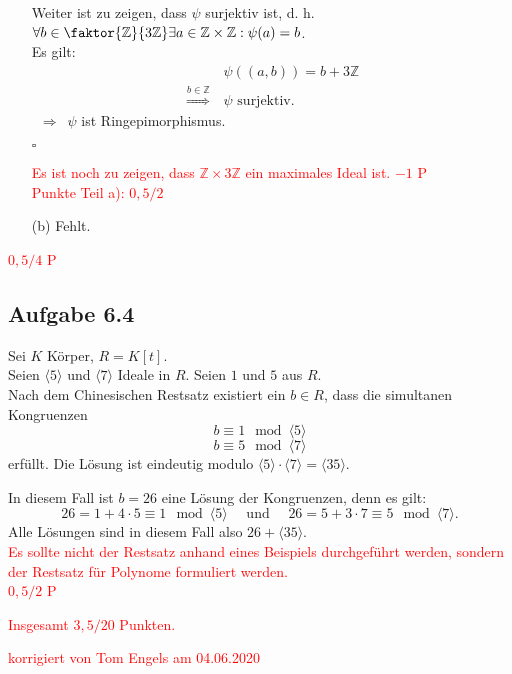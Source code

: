 \documentclass[12pt]{article}
\newcommand{\corr}[1]{\textcolor{red}{#1}}
\newcommand{\QED}{\begin{flushright} $\square$ \end{flushright}}
\newcommand{\df}{\enspace\Longrightarrow\enspace}
\newcommand{\ideal}[1]{\langle#1\rangle}
\begin{document}
\begin{enumerate}
	Weiter ist zu zeigen, dass $\psi$ surjektiv ist, d. h. $\forall b\in \faktor{\mathbb{Z}}{3\mathbb{Z}} \exists a\in\mathbb{Z}\times\mathbb{Z}:\psi(a)=b$. \\
	Es gilt:
	\begin{align*}
		&\psi((a,b)) = b+3\mathbb{Z} \\
		\overset{b\in\mathbb{Z}}{\df} &\psi\text{ surjektiv}.
	\end{align*}
	$\df \psi$ ist Ringepimorphismus.
	\QED
\corr{Es ist noch zu zeigen, dass $\mathbb{Z} \times 3\mathbb{Z}$ ein maximales Ideal ist. $-1$ P}\\
\corr{Punkte Teil a): $0,5/2$}
	
	\item[(b)] Fehlt.
	\end{enumerate}
\corr{$0,5/4$ P}

\subsection*{Aufgabe 6.4}
Sei $K$ Körper, $R=K[t]$. \\
Seien $\ideal{5}$ und $\ideal{7}$ Ideale in $R$. Seien $1$ und $5$ aus $R$. \\
Nach dem Chinesischen Restsatz existiert ein $b\in R$, dass die simultanen Kongruenzen
$$b\equiv 1\mod \ideal{5}$$
$$b\equiv 5\mod \ideal{7}$$
erfüllt. Die Lösung ist eindeutig modulo $\ideal{5}\cdot\ideal{7}=\ideal{35}$.

In diesem Fall ist $b=26$ eine Lösung der Kongruenzen, denn es gilt:
$$26=1+4\cdot5 \equiv 1\mod\ideal{5}\quad\text{ und }\quad 26=5+3\cdot 7\equiv 5\mod\ideal{7}.$$
Alle Lösungen sind in diesem Fall also $26+\ideal{35}$.\\
\corr{Es sollte nicht der Restsatz anhand eines Beispiels durchgeführt werden, sondern der Restsatz für Polynome formuliert werden.}\\
\corr{$0,5/2$ P}

\bigskip

\corr{Insgesamt $3,5/20$ Punkten.}

\bigskip

\corr{korrigiert von Tom Engels am 04.06.2020}
\end{document}
